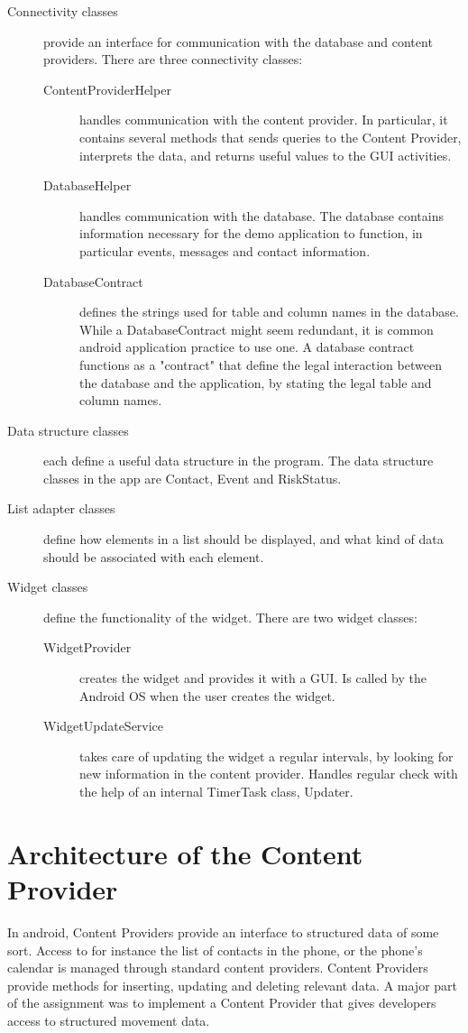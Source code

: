 \begin{description}
\item[Connectivity classes]
provide an interface for communication with the database and content providers. There are three connectivity classes:
\begin{description}
\item[ContentProviderHelper] handles communication with the content provider. In particular, it contains several methods that sends queries to the Content Provider, interprets the data, and returns useful values to the GUI activities.
\item[DatabaseHelper] handles communication with the database. The database contains information necessary for the demo application to function, in particular events, messages and contact information.
\item[DatabaseContract] defines the strings used for table and column names in the database. While a DatabaseContract might seem redundant, it is common android application practice to use one. A database contract functions as a "contract" that define the legal interaction between the database and the application, by stating the legal table and column names.
\end{description}

\item[Data structure classes]
each define a useful data structure in the program. The data structure classes in the app are Contact, Event and RiskStatus.

\item[List adapter classes]
define how elements in a list should be displayed, and what kind of data should be associated with each element.
\newpage
\item[Widget classes]
define the functionality of the widget. There are two widget classes:
\begin{description}
\item[WidgetProvider] creates the widget and provides it with a GUI. Is called by the Android OS when the user creates the widget.
\item[WidgetUpdateService] takes care of updating the widget a regular intervals, by looking for new information in the content provider. Handles regular check with the help of an internal TimerTask class, Updater.
\end{description}
\end{description}
\section{Architecture of the Content Provider}
In android, Content Providers provide an interface to structured data of some sort. Access to for instance the list of contacts in the phone, or the phone's calendar is managed through standard content providers. Content Providers provide methods for inserting, updating and deleting relevant data. A major part of the assignment was to implement a Content Provider that gives developers access to structured movement data.

